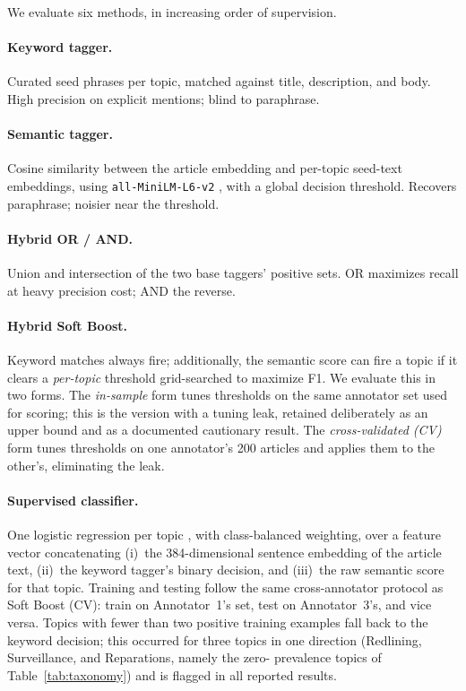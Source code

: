 \documentclass[letterpaper]{article}
\begin{document}
We evaluate six methods, in increasing order of supervision.

\paragraph{Keyword tagger.}
Curated seed phrases per topic, matched against title, description, and
body. High precision on explicit mentions; blind to paraphrase.

\paragraph{Semantic tagger.}
Cosine similarity between the article embedding and per-topic seed-text
embeddings, using \texttt{all-MiniLM-L6-v2} \citep{reimers2019}, with a
global decision threshold. Recovers paraphrase; noisier near the
threshold.

\paragraph{Hybrid OR / AND.}
Union and intersection of the two base taggers' positive sets. OR
maximizes recall at heavy precision cost; AND the reverse.

\paragraph{Hybrid Soft Boost.}
Keyword matches always fire; additionally, the semantic score can fire a
topic if it clears a \emph{per-topic} threshold grid-searched to maximize
F1. We evaluate this in two forms. The \emph{in-sample} form tunes
thresholds on the same annotator set used for scoring; this is the
version with a tuning leak, retained deliberately as an upper bound and
as a documented cautionary result. The \emph{cross-validated (CV)} form
tunes thresholds on one annotator's 200 articles and applies them to the
other's, eliminating the leak.

\paragraph{Supervised classifier.}
One logistic regression per topic \citep{pedregosa2011}, with
class-balanced weighting, over a feature vector concatenating (i)~the
384-dimensional sentence embedding of the article text, (ii)~the keyword
tagger's binary decision, and (iii)~the raw semantic score for that
topic. Training and testing follow the same cross-annotator protocol as
Soft Boost (CV): train on Annotator~1's set, test on Annotator~3's, and
vice versa. Topics with fewer than two positive training examples fall
back to the keyword decision; this occurred for three topics in one
direction (Redlining, Surveillance, and Reparations, namely the zero-
prevalence topics of Table~\ref{tab:taxonomy}) and is flagged in all
reported results.
\end{document}
